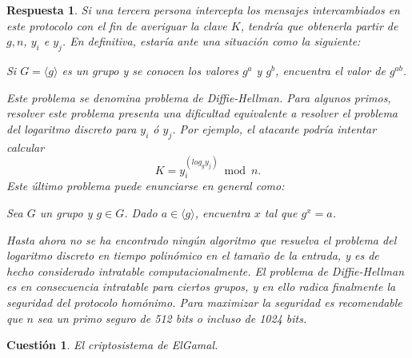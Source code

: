 \documentclass[
  a4paper,
  spanish,
  12pt,
]{scrartcl}
\theoremstyle{ejercicio-style}
\newtheorem{ejer}{Cuestión}
\theoremstyle{remark-style}
\newtheorem*{sol}{Respuesta}
\theoremstyle{teorema-style}
\begin{document}
\begin{sol}
  Si una tercera persona intercepta los mensajes intercambiados en este protocolo con el fin de averiguar la clave \(K\), tendría que obtenerla partir de $g, n$, \(y_i\) e \(y_j\). En definitiva, estaría ante una situación como la siguiente:
  \begin{displayquote}
    Si \(G = \langle g \rangle\) es un grupo y se conocen los valores $g^a$ y $g^b$, encuentra el valor de $g^{ab}$.
  \end{displayquote}
  Este problema se denomina \textit{problema de Diffie-Hellman}.
  Para algunos primos, resolver este problema presenta una dificultad equivalente a resolver el \textit{problema del logaritmo discreto} para \(y_i\) ó \(y_j\). Por ejemplo, el atacante podría intentar calcular \[K = y_i^{\left(log_{g} y_j\right)} \bmod n.\] Este último problema puede enunciarse en general como: \begin{displayquote}
    Sea \(G\) un grupo y \(g \in G\). Dado \(a \in \langle g \rangle\), encuentra \(x\) tal que \(g^x = a\).
  \end{displayquote}

  Hasta ahora no se ha encontrado ningún algoritmo que resuelva el problema del logaritmo discreto en tiempo polinómico en el tamaño de la entrada, y es de hecho considerado intratable computacionalmente.
  El problema de Diffie-Hellman es en consecuencia intratable para ciertos grupos, y en ello radica finalmente la seguridad del protocolo homónimo. Para maximizar la seguridad es recomendable que $n$ sea un \textit{primo seguro} de 512 bits o incluso de 1024 bits.
\end{sol}

\begin{ejer}
  El criptosistema de ElGamal.
\end{ejer}
\end{document}
